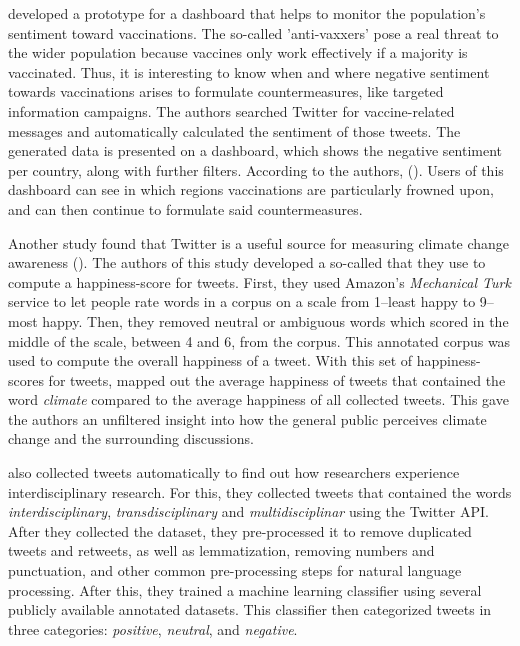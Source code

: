 \citeauthor{bahk2016publicly} developed a prototype for a dashboard that helps to monitor the population's sentiment toward vaccinations. The so-called 'anti-vaxxers' pose a real threat to the wider population because vaccines only work effectively if a majority is vaccinated. Thus, it is interesting to know when and where negative sentiment towards vaccinations arises to formulate countermeasures, like targeted information campaigns. The authors searched Twitter for vaccine-related messages and automatically calculated the sentiment of those tweets. The generated data is presented on a dashboard, which shows the negative sentiment per country, along with further filters. According to the authors,  (\cite[343]{bahk2016publicly}). Users of this dashboard can see in which regions vaccinations are particularly frowned upon, and can then continue to formulate said countermeasures.

Another study found that Twitter is a useful source for measuring climate change awareness (\cite{codyClimateChangeSentiment2015}). The authors of this study developed a so-called  that they use to compute a happiness-score for tweets. First, they used Amazon's \emph{Mechanical Turk} service to let people rate words in a corpus on a scale from 1--least happy to 9--most happy. Then, they removed neutral or ambiguous words which scored in the middle of the scale, between 4 and 6, from the corpus. This annotated corpus was used to compute the overall happiness of a tweet. With this set of happiness-scores for tweets, \citeauthor{codyClimateChangeSentiment2015} mapped out the average happiness of tweets that contained the word \emph{climate} compared to the average happiness of all collected tweets. This gave the authors an unfiltered insight into how the general public perceives climate change and the surrounding discussions.

\citeauthor{weberInterdisciplinaryOptimismSentiment2019} also collected tweets automatically to find out how researchers experience interdisciplinary research. For this, they collected tweets that contained the words \emph{interdisciplinary}, \emph{transdisciplinary} and \emph{multidisciplinar} using the Twitter API. After they collected the dataset, they pre-processed it to remove duplicated tweets and retweets, as well as lemmatization, removing numbers and punctuation, and other common pre-processing steps for natural language processing. After this, they trained a machine learning classifier using several publicly available annotated datasets. This classifier then categorized tweets in three categories: \emph{positive}, \emph{neutral}, and \emph{negative}.

